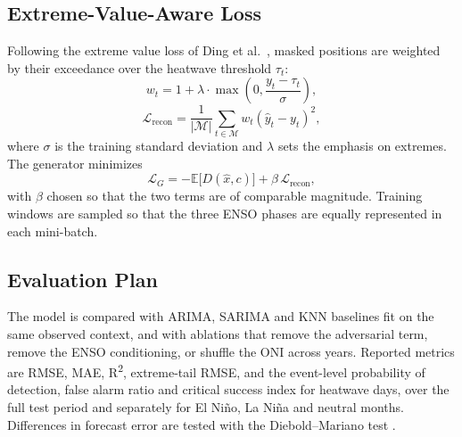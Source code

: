 \documentclass[conference]{IEEEtran}
\begin{document}
\subsection{Extreme-Value-Aware Loss}

Following the extreme value loss of Ding et al.~\cite{ding2019modeling}, masked positions are weighted
by their exceedance over the heatwave threshold $\tau_t$:
\begin{equation}
w_t = 1 + \lambda \cdot \max\!\left(0, \frac{y_t - \tau_t}{\sigma}\right),
\end{equation}
\begin{equation}
\mathcal{L}_{\text{recon}} = \frac{1}{|\mathcal{M}|}\sum_{t \in \mathcal{M}} w_t (\hat y_t - y_t)^2,
\end{equation}
where $\sigma$ is the training standard deviation and $\lambda$ sets the emphasis on extremes. The
generator minimizes
\begin{equation}
\mathcal{L}_G = -\mathbb{E}\big[D(\hat{x}, c)\big] + \beta \, \mathcal{L}_{\text{recon}},
\end{equation}
with $\beta$ chosen so that the two terms are of comparable magnitude. Training windows are sampled so
that the three ENSO phases are equally represented in each mini-batch.

\subsection{Evaluation Plan}

The model is compared with ARIMA, SARIMA and KNN baselines fit on the same observed context, and with
ablations that remove the adversarial term, remove the ENSO conditioning, or shuffle the ONI across
years. Reported metrics are RMSE, MAE, R\textsuperscript{2}, extreme-tail RMSE, and the event-level
probability of detection, false alarm ratio and critical success index for heatwave days, over the full
test period and separately for El Ni\~{n}o, La Ni\~{n}a and neutral months. Differences in forecast
error are tested with the Diebold--Mariano test \cite{diebold1995comparing}.



\end{document}
